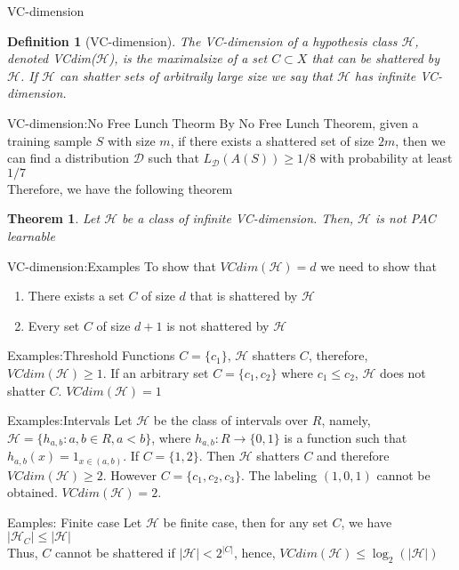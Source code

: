 \documentclass{beamer}
\newtheorem*{dfn}{Definition}
\newtheorem{thm}{Theorem}[subsection]
\begin{document}
\begin{frame}{VC-dimension}
	\begin{dfn}[VC-dimension]
		The VC-dimension of a hypothesis class $\mathcal{H}$, denoted VCdim($\mathcal{H}$), is the maximalsize of a set $C \subset X$ that can be shattered by $\mathcal{H}$. If $\mathcal{H}$ can shatter sets of arbitraily large size we say that $\mathcal{H}$ has infinite VC-dimension.
	\end{dfn}
\end{frame}
\begin{frame}{VC-dimension:No Free Lunch Theorm}
	By No Free Lunch Theorem, given a training sample $S$ with size $m$, if there exists a shattered set of size $2m$, then we can find a distribution $\mathcal{D}$ such that $L_{\mathcal{D}} (A(S)) \geq 1/8$ with probability at least $1/7$\\
	Therefore, we have the following theorem
	\begin{thm}
		Let $\mathcal{H}$ be a class of infinite VC-dimension. Then, $\mathcal{H}$ is not PAC learnable
	\end{thm}
\end{frame}
\begin{frame}{VC-dimension:Examples}
	To show that $VCdim(\mathcal{H})=d$ we need to show that 
	\begin{enumerate}
		\item There exists a set $C$ of size $d$ that is shattered  by $\mathcal{H}$
		\item Every set $C$ of size $d+1$ is not shattered by $\mathcal{H}$
	\end{enumerate}
\end{frame}
\begin{frame}{Examples:Threshold Functions}
	$C=\{c_1\}$, $\mathcal{H}$ shatters $C$, therefore, $VCdim(\mathcal{H}) \geq 1$. If an arbitrary set $C = \{c_1,c_2\}$ where $c_1 \leq c_2$, $\mathcal{H}$ does not shatter $C$. $VCdim(\mathcal{H})=1$
\end{frame}
\begin{frame}{Examples:Intervals}
	Let $\mathcal{H}$ be the class of intervals over $R$, namely, $\mathcal{H} = \{h_{a,b}:a,b \in R,a<b\}$, where $h_{a,b}:R \rightarrow \{0,1\}$ is a function such that $h_{a,b}(x) = 1_{x \in (a,b)}$. If $C = \{1,2\}$. Then $\mathcal{H}$ shatters $C$ and therefore $VCdim(\mathcal{H}) \geq 2$. However $C = \{c_1,c_2,c_3\}$. The labeling $(1,0,1)$ cannot be obtained. $VCdim(\mathcal{H})=2$.
\end{frame}
\begin{frame}{Eamples: Finite case}
	Let $\mathcal{H}$ be finite case, then for any set $C$, we have $|\mathcal{H}_C| \leq |\mathcal{H}|$ \\
	Thus, $C$ cannot be shattered if $|\mathcal{H}| < 2^{|C|}$, hence, $VCdim(\mathcal{H}) \leq \log_2(|\mathcal{H}|)$
\end{frame}
\end{document}
